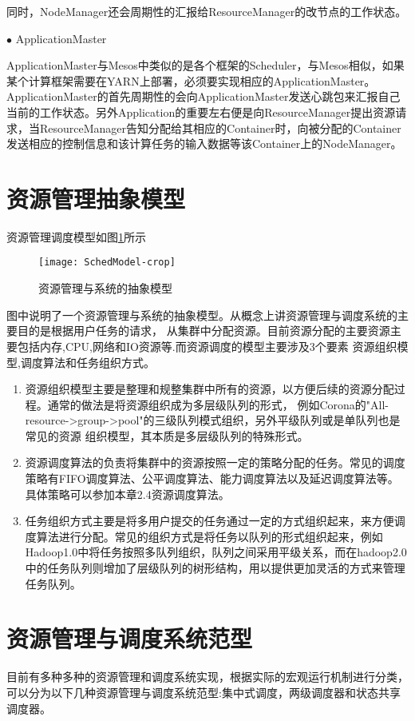 同时，NodeManager还会周期性的汇报给ResourceManager的改节点的工作状态。

$\bullet$ ApplicationMaster

ApplicationMaster与Mesos中类似的是各个框架的Scheduler，与Mesos相似，如果某个计算框架需要在YARN上部署，必须要实现相应的ApplicationMaster。ApplicationMaster的首先周期性的会向ApplicationMaster发送心跳包来汇报自己当前的工作状态。另外Application的重要左右便是向ResourceManager提出资源请求，当ResourceManager告知分配给其相应的Container时，向被分配的Container发送相应的控制信息和该计算任务的输入数据等该Container上的NodeManager。

\section{资源管理抽象模型}
 
资源管理调度模型如图\ref{fig:SchedModel}所示
\begin{figure}[htbp]
\centering\texttt{[image: SchedModel-crop]}
\caption{资源管理与系统的抽象模型}\label{fig:SchedModel}
\end{figure}
图中说明了一个资源管理与系统的抽象模型。从概念上讲资源管理与调度系统的主要目的是根据用户任务的请求，
从集群中分配资源。目前资源分配的主要资源主要包括内存,CPU,网络和IO资源等.而资源调度的模型主要涉及3个要素
资源组织模型,调度算法和任务组织方式。
\begin{enumerate}
\item 资源组织模型主要是整理和规整集群中所有的资源，以方便后续的资源分配过程。通常的做法是将资源组织成为多层级队列的形式，
例如Corona的"All-resource->group->pool"的三级队列模式组织，另外平级队列或是单队列也是常见的资源
组织模型，其本质是多层级队列的特殊形式。
\item 资源调度算法的负责将集群中的资源按照一定的策略分配的任务。常见的调度策略有FIFO调度算法、公平调度算法、能力调度算法以及延迟调度算法等。具体策略可以参加本章2.4资源调度算法。
\item 任务组织方式主要是将多用户提交的任务通过一定的方式组织起来，来方便调度算法进行分配。常见的组织方式是将任务以队列的形式组织起来，例如Hadoop1.0中将任务按照多队列组织，队列之间采用平级关系，而在hadoop2.0中的任务队列则增加了层级队列的树形结构，用以提供更加灵活的方式来管理任务队列。
\end{enumerate}
\section{资源管理与调度系统范型}
目前有多种多种的资源管理和调度系统实现，根据实际的宏观运行机制进行分类，可以分为以下几种资源管理与调度系统范型:集中式调度，两级调度器和状态共享调度器。

